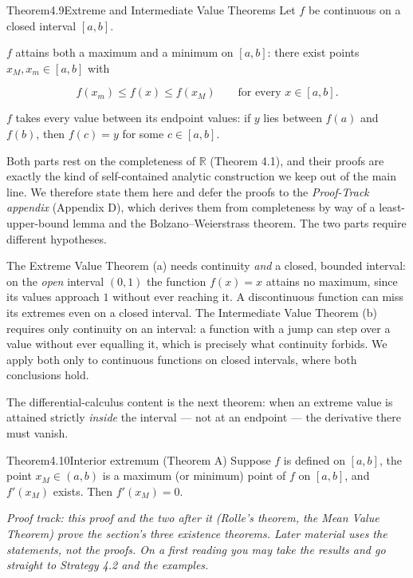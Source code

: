 \documentclass[a4paper,12pt,oneside]{memoir}
\begin{document}
\begin{envtheorem}{Theorem}{4.9}{Extreme and Intermediate Value Theorems}
Let \(f\) be continuous on a closed interval \([a, b]\).

 \(f\) attains both a maximum and a minimum on \([a, b]\): there exist points \(x_{M}, x_{m} \in [a, b]\) with

\[ f(x_{m}) \le f(x) \le f(x_{M}) \qquad \text{for every } x \in [a, b]. \]

 \(f\) takes every value between its endpoint values: if \(y\) lies between \(f(a)\) and \(f(b)\), then \(f(c) = y\) for some \(c \in [a, b]\).
\end{envtheorem}
Both parts rest on the completeness of \(\mathbb{R}\) (Theorem 4.1), and their proofs are exactly the kind of self-contained analytic construction we keep out of the main line. We therefore state them here and defer the proofs to the \emph{Proof-Track appendix} (Appendix D), which derives them from completeness by way of a least-upper-bound lemma and the Bolzano–Weierstrass theorem. The two parts require different hypotheses.

The Extreme Value Theorem (a) needs continuity \emph{and} a closed, bounded interval: on the \emph{open} interval \((0, 1)\) the function \(f(x) = x\) attains no maximum, since its values approach \(1\) without ever reaching it. A discontinuous function can miss its extremes even on a closed interval. The Intermediate Value Theorem (b) requires only continuity on an interval: a function with a jump can step over a value without ever equalling it, which is precisely what continuity forbids. We apply both only to continuous functions on closed intervals, where both conclusions hold.

The differential-calculus content is the next theorem: when an extreme value is attained strictly \emph{inside} the interval — not at an endpoint — the derivative there must vanish.

\begin{envtheorem}{Theorem}{4.10}{Interior extremum (Theorem A)}
Suppose \(f\) is defined on \([a, b]\), the point \(x_{M} \in (a, b)\) is a maximum (or minimum) point of \(f\) on \([a, b]\), and \(f'(x_{M})\) exists. Then \(f'(x_{M}) = 0\).
\end{envtheorem}
\emph{Proof track: this proof and the two after it (Rolle’s theorem, the Mean Value Theorem) prove the section’s three existence theorems. Later material uses the statements, not the proofs. On a first reading you may take the results and go straight to Strategy 4.2 and the examples.}
\end{document}
